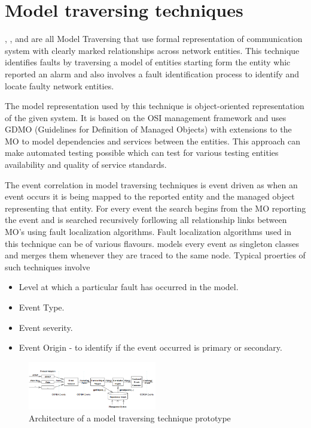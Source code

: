 \documentclass[10pt]{sigplan-proc-varsize}
\begin{document}
\section{Model traversing techniques}
\cite{Katker:96}, \cite{Katker:971}, \cite{Katker:97} and \cite{Gruschke:98} are all Model Traversing that use formal representation of communication 
system with clearly marked relationships across network entities. This technique identifies faults by traversing a model of entities starting form the entity whic reported an alarm and also involves a fault identification process to identify and locate faulty network entities.

The model representation used by this technique is object-oriented representation of the given system. It is based on the OSI management framework and uses GDMO (Guidelines for  Definition  of Managed Objects) with extensions to the MO to model dependencies and services between the entities. This approach can make automated testing possible which can test for various testing entities availability and quality of service standards. 

The event correlation in model traversing techniques is event driven as when an event occurs it is being mapped to the reported entity and the managed object representing that entity. For every event the search begins from the MO reporting the event and is searched recursively forllowing all relationship links between MO's using fault localization algorithms.  Fault localization algorithms used in this technique can be of various flavours.  models every event as singleton classes and merges them whenever they are traced to the same node. Typical proerties of such techniques involve 

\begin{itemize}
  \item Level at which a particular fault has occurred in the model.
  \item Event Type.
  \item Event severity.
  \item Event Origin - to identify if the event occurred is primary or secondary.
\end{itemize}

\begin{figure}[h!]
  \caption{Architecture of a model traversing technique prototype}
  \centering
    \includegraphics[width=0.5\textwidth]{Fig3}
\end{figure}
\end{document}
